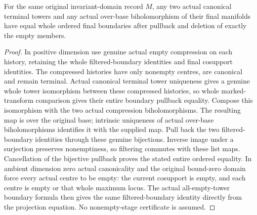 \begin{lemma}
\label{hir:original-terminal-filtered-boundary-transport}
\leanok
For the same original invariant-domain record $M$, any two actual
canonical terminal towers and any actual over-base biholomorphism of
their final manifolds have equal whole ordered final boundaries after
pullback and deletion of exactly the empty members.
\end{lemma}
\begin{proof}
In positive dimension use genuine actual empty compression on each
history, retaining the whole filtered-boundary identities and final
cosupport identities. The compressed histories have only nonempty
centres, are canonical and remain terminal. Actual canonical terminal
tower uniqueness gives a genuine whole tower isomorphism between these
compressed histories, so whole marked-transform comparison gives their
entire boundary pullback equality. Compose this isomorphism with the
two actual compression biholomorphisms. The resulting map is over the
original base; intrinsic uniqueness of actual over-base biholomorphisms
identifies it with the supplied map. Pull back the two filtered-boundary
identities through these genuine bijections. Inverse image under a
surjection preserves nonemptiness, so filtering commutes with these
list maps. Cancellation of the bijective pullback proves the stated
entire ordered equality. In ambient dimension zero actual canonicality
and the original bound-zero domain force every actual centre to be
empty: the current cosupport is empty, and each centre is empty or that
whole maximum locus. The actual all-empty-tower boundary formula then
gives the same filtered-boundary identity directly from the projection
equation. No nonempty-stage certificate is assumed.
\end{proof}

